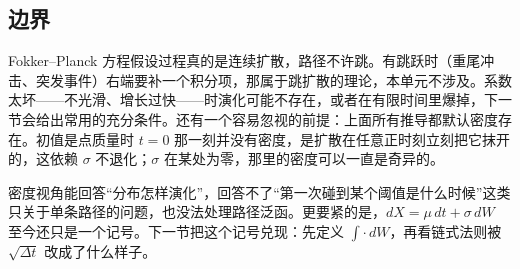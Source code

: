\subsection{边界}

Fokker--Planck 方程假设过程真的是连续扩散，路径不许跳。有跳跃时（重尾冲击、突发事件）右端要补一个积分项，那属于跳扩散的理论，本单元不涉及。系数太坏——不光滑、增长过快——时演化可能不存在，或者在有限时间里爆掉，下一节会给出常用的充分条件。还有一个容易忽视的前提：上面所有推导都默认密度存在。初值是点质量时 \(t=0\) 那一刻并没有密度，是扩散在任意正时刻立刻把它抹开的，这依赖 \(\sigma\) 不退化；\(\sigma\) 在某处为零，那里的密度可以一直是奇异的。

密度视角能回答``分布怎样演化''，回答不了``第一次碰到某个阈值是什么时候''这类只关于单条路径的问题，也没法处理路径泛函。更要紧的是，\(dX=\mu\,dt+\sigma\,dW\) 至今还只是一个记号。下一节把这个记号兑现：先定义 \(\int\cdot\,dW\)，再看链式法则被 \(\sqrt{\Delta t}\) 改成了什么样子。
